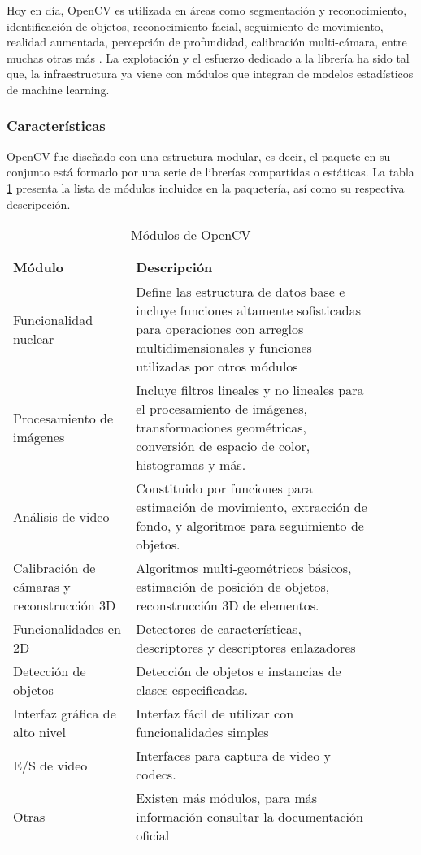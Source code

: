 Hoy en día, OpenCV es utilizada en áreas como segmentación y reconocimiento, identificación de objetos, reconocimiento facial, seguimiento de movimiento, realidad aumentada, percepción de profundidad, calibración multi-cámara, entre muchas otras más \cite{garcia2015learning}. La explotación y el esfuerzo dedicado a la librería ha sido tal que, la infraestructura ya viene con módulos que integran de modelos estadísticos de machine learning.

\subsubsection{Características}
OpenCV fue diseñado con una estructura modular, es decir, el paquete en su conjunto está formado por una serie de librerías compartidas o estáticas. La tabla \ref{tab:OpenCV} presenta la lista de módulos incluidos en la paquetería, así como su respectiva descripcción.

\begin{table}[ht]
    \centering
    \begin{tabular}{p{0.3\linewidth}p{0.6\linewidth}}
        \hline
        \textbf{Módulo} & \textbf{Descripción}\\ \hline \hline
        Funcionalidad nuclear & Define las estructura de datos base e incluye funciones altamente sofisticadas para operaciones con arreglos multidimensionales y funciones utilizadas por otros módulos \\ \hline
        Procesamiento de imágenes & Incluye filtros lineales y no lineales para el procesamiento de imágenes, transformaciones geométricas, conversión de espacio de color, histogramas y más.\\ \hline
        Análisis de video & Constituido por funciones para estimación de movimiento, extracción de fondo, y algoritmos para seguimiento de objetos.\\ \hline
        Calibración de cámaras y reconstrucción 3D & Algoritmos multi-geométricos básicos, estimación de posición de objetos, reconstrucción  3D de elementos.\\ \hline
        Funcionalidades en 2D &  Detectores de características, descriptores y descriptores enlazadores\\ \hline
        Detección de objetos & Detección de objetos e instancias de clases especificadas.\\ \hline
        Interfaz gráfica de alto nivel & Interfaz fácil de utilizar con funcionalidades simples\\ \hline
        E/S de video & Interfaces para captura de video y codecs.\\ \hline 
        Otras & Existen más módulos, para más información consultar la documentación oficial \cite{OpenCV}\\ \hline \hline
    \end{tabular}
    \caption{Módulos de OpenCV}
    \label{tab:OpenCV}
\end{table}

